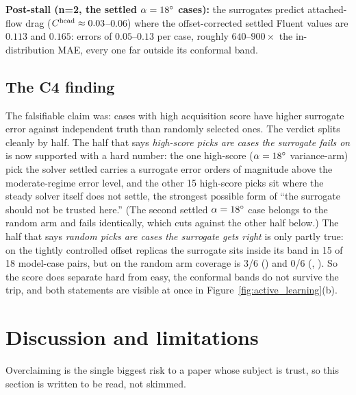 \textbf{Post-stall (n=2, the settled $\alpha=18^{\circ}$ cases):} the
surrogates predict attached-flow drag ($C^{\text{head}}\approx0.03$--$0.06$) where
the offset-corrected settled Fluent values are $0.113$ and $0.165$: errors of
$0.05$--$0.13$ per case, roughly $640$--$900\times$ the in-distribution MAE,
every one far outside its conformal band.

\subsection{The C4 finding}
The falsifiable claim was: cases with high acquisition score have higher
surrogate error against independent truth than randomly selected ones. The
verdict splits cleanly by half. The half that says \emph{high-score picks are
cases the surrogate fails on} is now supported with a hard number: the one
high-score ($\alpha=18^{\circ}$ variance-arm) pick the solver settled carries a
surrogate error orders of magnitude above the moderate-regime error level,
and the other 15
high-score picks sit where the
steady solver itself does not settle, the strongest possible form of ``the
surrogate should not be trusted here.'' (The second settled
$\alpha=18^{\circ}$ case belongs to the random arm and fails identically,
which cuts against the other half below.) The half that says \emph{random picks
are cases the surrogate gets right} is only partly true: on the tightly
controlled offset replicas the surrogate sits inside its band in 15 of 18
model-case pairs, but on the random arm coverage is 3/6 (\Mgnn) and 0/6
(\Mfno, \Mtrans). So the score does separate hard from easy, the conformal
bands do not survive the trip, and both statements are visible at once in
Figure~\ref{fig:active_learning}(b).

\begin{widetable}
  
\end{widetable}

\section{Discussion and limitations}
\label{sec:discussion}

Overclaiming is the single biggest risk to a paper whose subject is trust, so
this section is written to be read, not skimmed.

